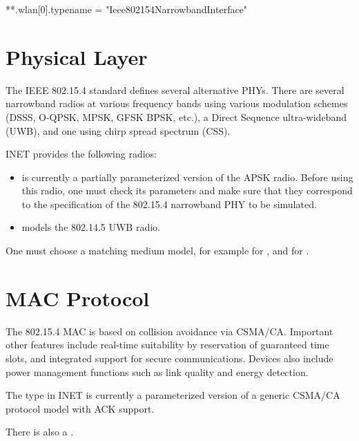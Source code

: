 \begin{inifile}
**.wlan[0].typename = "Ieee802154NarrowbandInterface"
\end{inifile}

\section{Physical Layer}

The IEEE 802.15.4 standard defines several alternative PHYs. There are
several narrowband radios at various frequency bands using various modulation
schemes (DSSS, O-QPSK, MPSK, GFSK BPSK, etc.), a Direct Sequence ultra-wideband
(UWB), and one using chirp spread spectrum (CSS).

INET provides the following radios: 

\begin{itemize}
  \item {} is currently a partially 
    parameterized version of the APSK radio. Before using this radio, 
    one must check its parameters and make sure that they correspond to the 
    specification of the 802.15.4 narrowband PHY to be simulated. 
  \item {} models the 802.14.5 UWB radio. 
\end{itemize}

One must choose a matching medium model, for example
 for ,
and  for
.


\section{MAC Protocol}

The 802.15.4 MAC is based on collision avoidance via CSMA/CA. Important other
features include real-time suitability by reservation of guaranteed time slots,
and integrated support for secure communications. Devices also include power
management functions such as link quality and energy detection.

The  type in INET is currently a parameterized
version of a generic CSMA/CA protocol model with ACK support.

There is also a .



